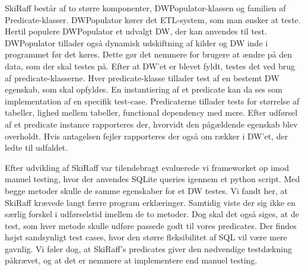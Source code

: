 SkiRaff består af to større komponenter, DWPopulator-klassen og familien af Predicate-klasser. DWPopulator kører det ETL-system, som man ønsker at teste. Hertil populere DWPopulator  et udvalgt DW, der kan anvendes til test. DWPopulator tillader også dynamisk udskiftning af kilder og DW inde i programmet før det køres. Dette gør det nemmere for brugere at ændre på den data, som der skal testes på. Efter at DW’et er blevet fyldt, testes det ved brug af predicate-klasserne. Hver predicate-klasse tillader test af en bestemt DW egenskab, som skal opfyldes. En instantiering af et predicate kan da ses som implementation af en specifik test-case. Predicaterne tillader tests for størrelse af tabeller, lighed mellem tabeller, functional dependency med mere. Efter udførsel af et predicate instance rapporteres der, hvorvidt den pågældende egenskab blev overholdt. Hvis antagelsen fejler rapporteres der også om rækker i DW’et, der ledte til udfaldet. 

Efter udvikling af SkiRaff var tilendebragt evaluerede vi frameworket op imod manuel testing, hvor der anvendes SQLite queries igennem et python script. Med begge metoder skulle de samme egenskaber for et DW testes. Vi fandt her, at SkiRaff krævede langt færre program erklæringer. Samtidig viste der sig ikke en særlig forskel i udførselstid imellem de to metoder. Dog skal det også siges, at de test, som hver metode skulle udføre passede godt til vores predicates. Der findes højst sandsynligt test cases, hvor den større fleksibilitet af SQL vil være mere gavnlig. Vi føler dog, at SkiRaff’s predicates giver den nødvendige testdækning påkrævet, og at det er nemmere at implementere end manuel testing.










